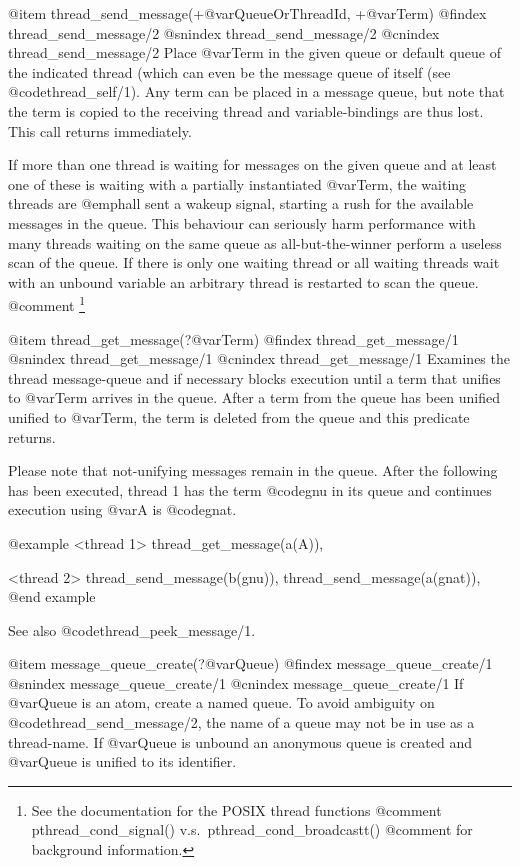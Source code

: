 {{{{{{{{{@item thread_send_message(+@var{QueueOrThreadId}, +@var{Term})
@findex thread_send_message/2
@snindex thread_send_message/2
@cnindex thread_send_message/2
Place @var{Term} in the given queue or default queue of the indicated
thread (which can even be the message queue of itself (see
@code{thread_self/1}). Any term can be placed in a message queue, but note that
the term is copied to the receiving thread and variable-bindings are
thus lost. This call returns immediately.

If more than one thread is waiting for messages on the given queue and
at least one of these is waiting with a partially instantiated
@var{Term}, the waiting threads are @emph{all} sent a wakeup signal,
starting a rush for the available messages in the queue.  This behaviour
can seriously harm performance with many threads waiting on the same
queue as all-but-the-winner perform a useless scan of the queue. If
there is only one waiting thread or all waiting threads wait with an
unbound variable an arbitrary thread is restarted to scan the queue.
@comment	\footnote{See the documentation for the POSIX thread functions
@comment		  pthread_cond_signal() v.s.\ pthread_cond_broadcastt()
@comment		  for background information.}

@item thread_get_message(?@var{Term})
@findex thread_get_message/1
@snindex thread_get_message/1
@cnindex thread_get_message/1
Examines the thread message-queue and if necessary blocks execution
until a term that unifies to @var{Term} arrives in the queue.  After
a term from the queue has been unified unified to @var{Term}, the
term is deleted from the queue and this predicate returns.

Please note that not-unifying messages remain in the queue.  After
the following has been executed, thread 1 has the term @code{gnu}
in its queue and continues execution using @var{A} is @code{gnat}.

@example
   <thread 1>
   thread_get_message(a(A)),

   <thread 2>
   thread_send_message(b(gnu)),
   thread_send_message(a(gnat)),
@end example

See also @code{thread_peek_message/1}.

@item message_queue_create(?@var{Queue})
@findex message_queue_create/1
@snindex message_queue_create/1
@cnindex message_queue_create/1
If @var{Queue} is an atom, create a named queue.  To avoid ambiguity
on @code{thread_send_message/2}, the name of a queue may not be in use
as a thread-name.  If @var{Queue} is unbound an anonymous queue is
created and @var{Queue} is unified to its identifier.

}}}}}}}}}
